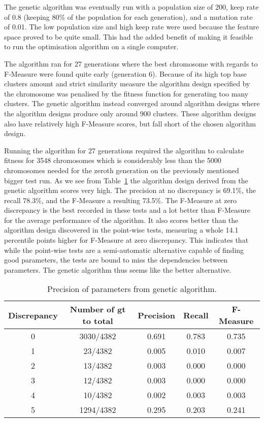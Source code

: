 The genetic algorithm was eventually run with a population size of 200, keep rate of 0.8 (keeping 80\% of the population for each generation), and a mutation rate of 0.01. The low population size and high keep rate were used because the feature space proved to be quite small. This had the added benefit of making it feasible to run the optimisation algorithm on a single computer.

The algorithm ran for 27 generations where the best chromosome with regards to F-Measure were found quite early (generation 6). Because of its high top base clusters amount and strict similarity measure the algorithm design specified by the chromosome was penalised by the fitness function for generating too many clusters. The genetic algorithm instead converged around algorithm designs where the algorithm designs produce only around 900 clusters. These algorithm designs also have relatively high F-Measure scores, but fall short of the chosen algorithm design.

Running the algorithm for 27 generations required the algorithm to calculate fitness for 3548 chromosomes which is considerably less than the 5000 chromosomes needed for the zeroth generation on the previously mentioned bigger test run. As we see from Table~\ref{tab:geneticparametersresults} the algorithm design derived from the genetic algorithm scores very high. The precision at no discrepancy is 69.1\%, the recall 78.3\%, and the F-Measure a resulting 73.5\%. The F-Measure at zero discrepancy is the best recorded in these tests and a lot better than F-Measure for the average performance of the algorithm. It also scores better than the algorithm design discovered in the point-wise tests, measuring a whole 14.1 percentile points higher for F-Measure at zero discrepancy. This indicates that while the point-wise tests are a semi-automatic alternative capable of finding good parameters, the tests are bound to miss the dependencies between parameters. The genetic algorithm thus seems like the better alternative.

\begin{table}[H]
\begin{center}
\begin{tabular}{|c|c|ccc|}
\hline
Discrepancy & Number of gt to total & Precision & Recall & F-Measure\\ 
\hline
0&   3030/4382&   0.691&    0.783&    0.735\\ 
1&   23/4382&     0.005&    0.010&    0.007\\ 
2&   13/4382&     0.003&    0.000&    0.000\\ 
3&   12/4382&     0.003&    0.000&    0.000\\ 
4&   10/4382&     0.002&    0.003&    0.003\\ 
5&   1294/4382&   0.295&    0.203&    0.241\\
\hline
\end{tabular}
\end{center}
\caption{Precision of parameters from genetic algorithm.}
\label{tab:geneticparametersresults}
\end{table}







